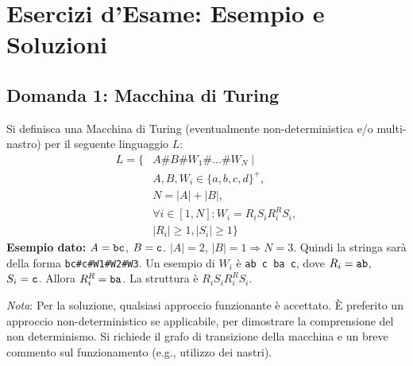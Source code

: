 \documentclass[a4paper]{article}
\theoremstyle{definition} %
\begin{document}
\section{Esercizi d'Esame: Esempio e Soluzioni}

\subsection{Domanda 1: Macchina di Turing}
Si definisca una Macchina di Turing (eventualmente non-deterministica e/o multi-nastro) per il seguente linguaggio $L$:
\begin{align*}
L = \{ & A \# B \# W_1 \# \dots \# W_N \mid \\
& A, B, W_i \in \{a,b,c,d\}^+, \\
& N = |A| + |B|, \\
& \forall i \in [1, N]: W_i = R_i S_i R_i^R S_i, \\
& |R_i| \ge 1, |S_i| \ge 1 \}
\end{align*}
\textbf{Esempio dato:} $A = \text{\texttt{bc}}$, $B = \text{\texttt{c}}$. $|A|=2$, $|B|=1 \Rightarrow N = 3$.
Quindi la stringa sarà della forma \texttt{bc\#c\#W1\#W2\#W3}.
Un esempio di $W_i$ è \texttt{ab c ba c}, dove $R_i=\text{\texttt{ab}}$, $S_i=\text{\texttt{c}}$. Allora $R_i^R = \text{\texttt{ba}}$. La struttura è $R_i S_i R_i^R S_i$.

\textit{Nota}: Per la soluzione, qualsiasi approccio funzionante è accettato. È preferito un approccio non-deterministico se applicabile, per dimostrare la comprensione del non determinismo. Si richiede il grafo di transizione della macchina e un breve commento sul funzionamento (e.g., utilizzo dei nastri).
\end{document}

